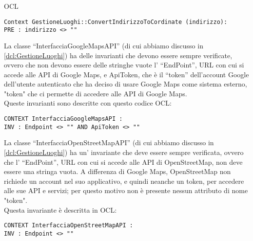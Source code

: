 \begin{listaPersonale}{OCL}
    \begin{lstlisting}
Context GestioneLuoghi::ConvertIndirizzoToCordinate (indirizzo):
PRE : indirizzo <> ""
    \end{lstlisting}




    \begin{center}
        
    \end{center}
    La classe “InterfacciaGoogleMapsAPI” (di cui abbiamo discusso in \ref{dcl:GestioneLuoghi}) ha delle invarianti che devono essere sempre verificate, ovvero che non devono essere delle stringhe vuote l’ “EndPoint”, URL con cui si accede alle API di Google Maps, e ApiToken, che è il “token” dell'account Google dell'utente autenticato che ha deciso di usare Google Maps come sistema esterno, "token" che ci permette di accedere alle API di Google Maps.\\
    Queste invarianti sono descritte con questo codice OCL:
    \begin{lstlisting}
CONTEXT InterfacciaGoogleMapsAPI :
INV : Endpoint <> "" AND ApiToken <> ""
    \end{lstlisting}




    \begin{center}
        
    \end{center}
    La classe “InterfacciaOpenStreetMapAPI” (di cui abbiamo discusso in \ref{dcl:GestioneLuoghi}) ha un’ invariante che deve essere sempre verificata, ovvero che l’ “EndPoint”, URL con cui si accede alle API di OpenStreetMap, non deve essere una stringa vuota. A differenza di Google Maps, OpenStreetMap non richiede un account nel suo applicativo, e quindi neanche un token, per accedere alle sue API e servizi; per questo motivo non è presente nessun attributo di nome "token".\\
    Questa invariante è descritta in OCL:
    \begin{lstlisting}
CONTEXT InterfacciaOpenStreetMapAPI :
INV : Endpoint <> ""
    \end{lstlisting}





\end{listaPersonale}
